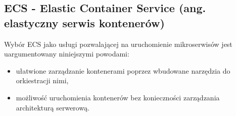 \documentclass[12pt,twoside]{book}
\begin{document}
\subsection{ECS - Elastic Container Service (ang. elastyczny serwis kontenerów)}
Wybór ECS jako usługi pozwalającej na uruchomienie mikroserwisów jest uargumentowany niniejszymi powodami:

\begin{itemize}
\item ułatwione zarządzanie kontenerami poprzez wbudowane narzędzia do orkiestracji nimi,
\item możliwość uruchomienia kontenerów bez konieczności zarządzania architekturą serwerową. \cite{aws.ecs}
\end{itemize}



\listoffigures
\end{document}
